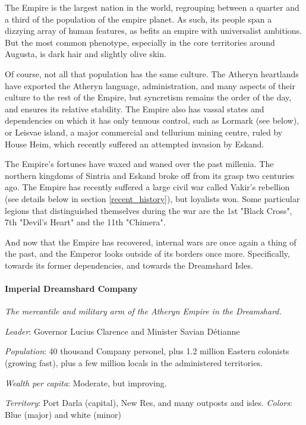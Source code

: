 The Empire is the largest nation in the world, regrouping between a quarter and a third of the population of the empire planet. As such, its people span a dizzying array of human features, as befits an empire with universalist ambitions. But the most common phenotype, especially in the core territories around Augusta, is dark hair and slightly olive skin.

Of course, not all that population has the same culture. The Atheryn heartlands have exported the Atheryn language, administration, and many aspects of their culture to the rest of the Empire, but syncretism remains the order of the day, and ensures its relative stability. The Empire also has vassal states and dependencies on which it has only tenuous control, such as Lormark (see below), or Leisvae island, a major commercial and tellurium mining centre, ruled by House Heim, which recently suffered an attempted invasion by Eskand.


The Empire's fortunes have waxed and waned over the past millenia. The northern kingdoms of Sintria and Eskand broke off from its grasp two centuries ago. The Empire has recently suffered a large civil war called Vakir's rebellion (see details below in section \ref{recent_history}), but loyalists won. Some particular legions that distinguished themselves during the war are the 1st "Black Cross", 7th "Devil's Heart" and the 11th "Chimera".


And now that the Empire has recovered, internal wars are once again a thing of the past, and the Emperor looks outside of its borders once more. Specifically, towards its former dependencies, and towards the Dreamshard Isles. 




\paragraph{Imperial Dreamshard Company}

\textit{The mercantile and military arm of the Atheryn Empire in the Dreamshard.}

\textit{Leader}: Governor Lucius Clarence and Minister Savian Détianne

\textit{Population}: 40 thousand Company personel, plus 1.2 million Eastern colonists (growing fast), plus a few million locals in the administered territories.

\textit{Wealth per capita}: Moderate, but improving.

\textit{Territory}: Port Darla (capital), New Res, and many outposts and isles.
\textit{Colors}: Blue (major) and white (minor)


